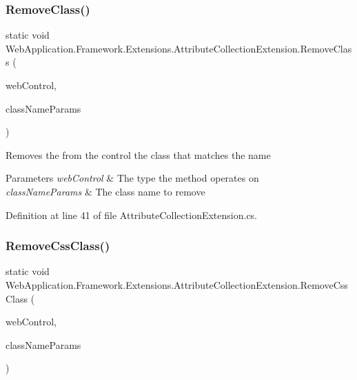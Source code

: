 \subsubsection{\texorpdfstring{RemoveClass()}{RemoveClass()}}
{\footnotesize\ttfamily static void Web\+Application.\+Framework.\+Extensions.\+Attribute\+Collection\+Extension.\+Remove\+Class (\begin{DoxyParamCaption}\item[{this Web\+Control}]{web\+Control,  }\item[{params string \mbox{[}$\,$\mbox{]}}]{class\+Name\+Params }\end{DoxyParamCaption})\hspace{0.3cm}{\ttfamily [static]}}



Removes the from the control the class that matches the name 


\begin{DoxyParams}{Parameters}
{\em web\+Control} & The type the method operates on\\
\hline
{\em class\+Name\+Params} & The class name to remove\\
\hline
\end{DoxyParams}


Definition at line 41 of file Attribute\+Collection\+Extension.\+cs.

\mbox{\label{classWebApplication_1_1Framework_1_1Extensions_1_1AttributeCollectionExtension_a57da0b59b4e4617987344f8471a5d4d1}} 
\subsubsection{\texorpdfstring{RemoveCssClass()}{RemoveCssClass()}}
{\footnotesize\ttfamily static void Web\+Application.\+Framework.\+Extensions.\+Attribute\+Collection\+Extension.\+Remove\+Css\+Class (\begin{DoxyParamCaption}\item[{this Web\+Control}]{web\+Control,  }\item[{params string \mbox{[}$\,$\mbox{]}}]{class\+Name\+Params }\end{DoxyParamCaption})\hspace{0.3cm}{\ttfamily [static]}}



